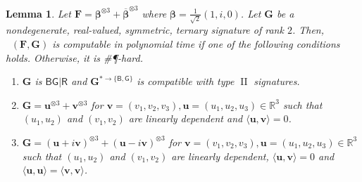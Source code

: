 \documentclass[11pt]{article}
\newtheorem{lemma}[theorem]{Lemma}
\DeclareMathOperator{\holts}{Holant^*_3}
\DeclareMathOperator{\typeii}{II}
\newcommand{\db}{\mathsf{B}}
\newcommand{\dg}{\mathsf{G}}
\newcommand{\dr}{\mathsf{R}}
\newcommand{\sph}{\#\P-hard\xspace}
\newcommand{\teh}{^{\otimes 3}}
\newcommand{\domres}[1]{
  ^{*\to\{#1\}}
}
\begin{document}
\begin{lemma}\label{lem:dichotomy-terneray-ternary-rank-2-z}
  Let $\mathbf{F} = \boldsymbol{\beta} \teh + \overline{\boldsymbol{\beta}} \teh$ where $\boldsymbol{\beta} = \frac{1}{\sqrt{2}} (1, i, 0)$.
  Let $\mathbf{G}$ be a nondegenerate, real-valued, symmetric, ternary signature of rank $2$.
  Then, $\holts(\mathbf{F}, \mathbf{G})$ is computable in polynomial time if one of the following conditions holds. Otherwise, it is \sph.
  \begin{enumerate}
    \item $\mathbf{G}$ is $\db \dg | \dr$ and $\mathbf{G}\domres{\db, \dg}$ is compatible with type $\typeii$ signatures.
    \item $\mathbf{G} = \mathbf{u}\teh + \mathbf{v}\teh$ for $\mathbf{v} = (v_1, v_2, v_3), \mathbf{u} = (u_1, u_2, u_3) \in \mathbb{R}^3$ such that $(u_1, u_2)$ and $(v_1, v_2)$ are linearly dependent and $\langle \mathbf{u}, \mathbf{v} \rangle = 0$.
    \item $\mathbf{G} = (\mathbf{u} + i \mathbf{v})\teh + (\mathbf{u} - i \mathbf{v})\teh$ for $\mathbf{v} = (v_1, v_2, v_3), \mathbf{u} = (u_1, u_2, u_3) \in \mathbb{R}^3$ such that $(u_1, u_2)$ and $(v_1, v_2)$ are linearly dependent, $\langle \mathbf{u}, \mathbf{v} \rangle = 0$ and $\langle \mathbf{u}, \mathbf{u} \rangle = \langle \mathbf{v}, \mathbf{v} \rangle$.
  \end{enumerate}
\end{lemma}
\end{document}
